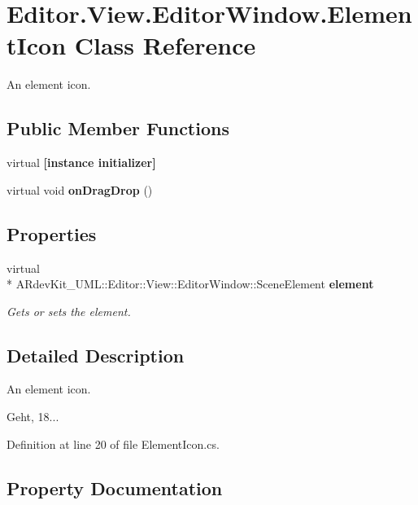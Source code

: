 \section{Editor.\-View.\-Editor\-Window.\-Element\-Icon Class Reference}
\label{class_editor_1_1_view_1_1_editor_window_1_1_element_icon}


An element icon.  


\subsection*{Public Member Functions}
\begin{DoxyCompactItemize}
\item 
virtual {\bfseries [instance initializer]}\label{class_editor_1_1_view_1_1_editor_window_1_1_element_icon_a0aaa5b1d409bcd14bc3a005b976cdd46}

\item 
virtual void {\bfseries on\-Drag\-Drop} ()\label{class_editor_1_1_view_1_1_editor_window_1_1_element_icon_a8c6c3844fa4ba6003294cedff86c14e4}

\end{DoxyCompactItemize}
\subsection*{Properties}
\begin{DoxyCompactItemize}
\item 
virtual \\*
A\-Rdev\-Kit\-\_\-\-U\-M\-L\-::\-Editor\-::\-View\-::\-Editor\-Window\-::\-Scene\-Element {\bf element}\hspace{0.3cm}{\ttfamily  [get, set]}
\begin{DoxyCompactList}\small\item\em Gets or sets the element. \end{DoxyCompactList}\end{DoxyCompactItemize}


\subsection{Detailed Description}
An element icon. 

Geht, 18... 

Definition at line 20 of file Element\-Icon.\-cs.



\subsection{Property Documentation}
